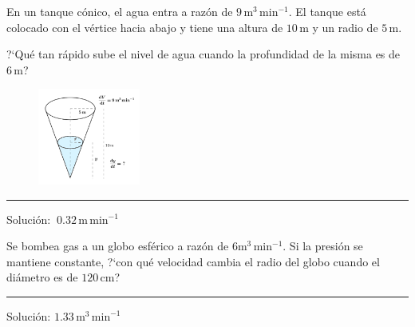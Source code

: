 \vspace{1cm}
\begin{mipropuesto}

\begin{multicols}{2}
En un tanque cónico, el agua entra a razón de $9\, \mathrm{m}^3\, \mathrm{min}^{-1}$. El tanque está colocado con el vértice hacia abajo y tiene una altura de $10\, \mathrm{m}$ y un radio de $5\, \mathrm{m}$.

\vspace{2mm} ?`Qué tan rápido sube el nivel de agua cuando la profundidad de la misma es de $6\, \mathrm{m}$?
\begin{figure}[H]
	\centering
	\includegraphics[width=0.3\textwidth]{imagenes/T02IM11.png}
	\end{figure}
\end{multicols}	

\color{olive}
\rule{200pt}{0.2pt}
\color{black}

\begin{flushright}
	 Solución: $\ 0.32\, \mathrm{m\, min}^{-1}$
\end{flushright}

\end{mipropuesto}





\vspace{1cm}
\begin{mipropuesto}

Se bombea gas a un globo esférico a razón de $6\mathrm{m}^3\, \mathrm{min}^{-1}$. Si la presión se mantiene constante, ?`con qué velocidad cambia el radio del globo cuando el diámetro es de $120\, \mathrm{cm}$?

\color{olive}
\rule{200pt}{0.2pt}
\color{black}


\begin{flushright}
		 Solución: $1.33 \, \mathrm{m}^3 \, \mathrm{min}^{-1}$
\end{flushright}

\end{mipropuesto}




